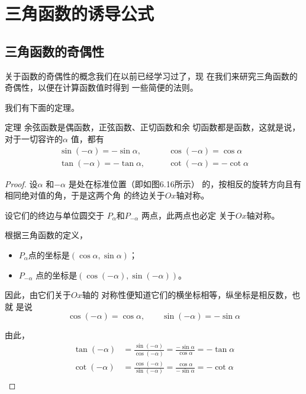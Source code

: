 \section{三角函数的诱导公式}
\subsection{三角函数的奇偶性}
关于函数的奇偶性的概念我们在以前已经学习过了，现
在我们来研究三角函数的奇偶性，以便在计算函数值时得到
一些简便的法则。

我们有下面的定理。
\begin{blk}{定理}
    余弦函数是偶函数，正弦函数、正切函数和余
    切函数都是函数，这就是说，对于一切容许的$\alpha$ 值，都有
  \begin{equation}
 \begin{split}
        \sin(-\alpha )=-\sin\alpha,&\qquad \cos(-\alpha )=\cos\alpha\\
          \tan(-\alpha )=-\tan\alpha,&\qquad  \cot(-\alpha )=-\cot\alpha
    \end{split}     
  \end{equation}  
\end{blk}

\begin{proof}
设$\alpha$ 和$-\alpha$ 是处在标准位置（即如图6.16所示）
的，按相反的旋转方向且有相同绝对值的角，于是这两个角
的终边关于$Ox$轴对称。

\begin{figure}[htp]
    \centering
{}
    \caption{}
\end{figure}


设它们的终边与单位圆交于
$P_{\alpha}$和$P_{-\alpha}$ 两点，此两点也必定
关于$Ox$轴对称。

根据三角函数的定义，
\begin{itemize}
    \item $P_{\alpha}$点的坐标是$(\cos\alpha ,\sin\alpha)$；
    \item $P_{-\alpha}$
点的坐标是$(\cos(-\alpha ),\sin(-\alpha ))$。
\end{itemize}

因此，由它们关于$Ox$轴的
对称性便知道它们的横坐标相等，纵坐标是相反数，也就
是说
\[\cos(-\alpha )=\cos\alpha ,\qquad \sin(-\alpha )= -\sin\alpha\]

由此，
\[\begin{split}
    \tan(-\alpha)&=\frac{\sin(-\alpha)}{\cos(-\alpha)}=\frac{-\sin\alpha}{\cos\alpha}=-\tan\alpha\\
    \cot(-\alpha)&=\frac{\cos(-\alpha)}{\sin(-\alpha)}=\frac{\cos\alpha}{-\sin\alpha}=-\cot\alpha\\
\end{split}\]
\end{proof}

